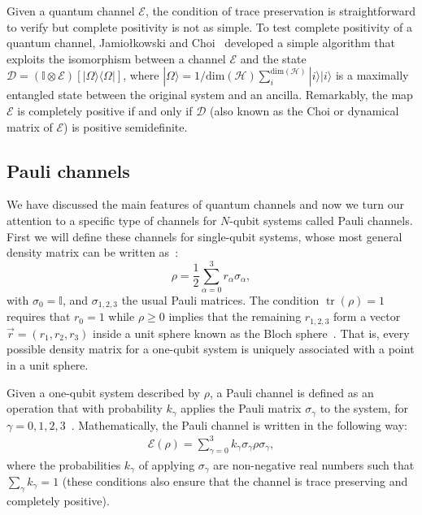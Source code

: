 \documentclass[10pt,letterpaper]{article} %
\DeclareMathOperator{\tr}{tr}
\begin{document}
Given a quantum channel $\mathcal{E}$, the condition of trace preservation is
straightforward to verify but complete positivity is not as simple.  To test
complete positivity of a quantum channel, Jamiołkowski and
Choi~\cite{choi,jamil} developed a simple algorithm that exploits the
isomorphism between a channel $\mathcal{E}$ and the state $\mathcal{D} =
(\mathbb{I} \otimes \mathcal{E}) [|\Omega \rangle \langle  \Omega|]$, where
$|\Omega\rangle = 1/\text{dim}(\mathcal{H}) \sum_{i}^{\text{dim}(\mathcal{H})}
|i \rangle |i \rangle$ is a maximally entangled state between the original
system and an ancilla.  Remarkably, the map $\mathcal{E}$ is completely
positive if and only if $\mathcal{D}$ (also known as the Choi or dynamical
matrix of $\mathcal{E}$) is positive semidefinite.

\subsection{Pauli channels}  \label{subsec: Pauli Channels} %

We have discussed the main features of quantum channels and 
now we turn our attention to a specific 
type of channels for $N$-qubit systems called Pauli channels.
First we will define these channels for single-qubit systems,
whose most general density matrix can be written as~\cite{chuangbook}:
\begin{equation}
\label{eq: Density Matrix}
\rho = \dfrac{1}{2} \sum_{\alpha=0}^{3} r_{\alpha} \sigma_{\alpha},
\end{equation}
with $\sigma_0 = \mathbb{I}$, and $\sigma_{1,2,3}$ the usual Pauli matrices.
The condition $\tr(\rho) = 1$ requires that $r_0 = 1$ while $\rho \geq 0$ 
implies that the remaining $r_{1,2,3}$ form
a vector $\vec{r}= (r_1,r_2,r_3)$ inside a unit sphere known as the Bloch sphere~\cite{Marinescu}.
That is, every possible density matrix for a one-qubit
system is uniquely associated with a point in a unit sphere. 

Given a one-qubit system described by $\rho$, 
a Pauli channel is defined as an operation that with probability $k_{\gamma}$
applies the Pauli matrix $\sigma_{\gamma}$ to
the system, for $\gamma = 0,1,2,3$~\cite{geometry}.
Mathematically, the Pauli channel is written in the following way:
\begin{eqnarray}
\label{eq: Pauli channel 1 qbit}
\mathcal{E}(\rho) = \sum_{\gamma=0}^3 k_{\gamma} \sigma_{\gamma} \rho \sigma_{\gamma},
\end{eqnarray} 
where the probabilities $k_{\gamma}$ of applying $\sigma_{\gamma}$
are non-negative real numbers such that 
$\sum_{\gamma} k_{\gamma} = 1$ (these conditions also ensure that the channel is 
trace preserving and completely positive).
\end{document}
